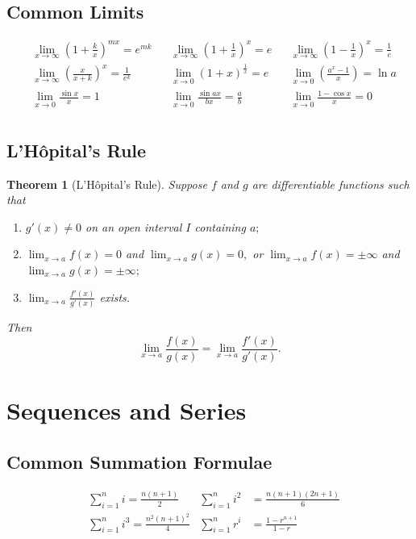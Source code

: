 \documentclass[12pt]{article}
\newtheorem{thrm}{Theorem}
\begin{document}
\subsection{Common Limits}
\begin{align*}
&\lim_{x \to \infty}{\left(1 + \frac{k}{x}\right)}^{mx} = e^{mk} & &\lim_{x \to \infty}{\left(1 + \frac{1}{x}\right)}^{x} = e & &\lim_{x \to \infty}{\left(1 - \frac{1}{x}\right)}^{x} = \frac{1}{e}\\
&\lim_{x \to \infty}{\left(\frac{x}{x+k}\right)}^{x} = \frac{1}{e^k} & &\lim_{x \to 0}{\left(1 + x\right)}^{\frac{1}{x}} = e & &\lim_{x \to 0}{\left(\frac{a^x - 1}{x}\right)} = \ln a \\ 
&\lim_{x \to 0}{\frac{\sin x}{x}} = 1 & &\lim_{x \to 0}{\frac{\sin{ax}}{bx}} = \frac{a}{b} & &\lim_{x \to 0}{\frac{1 - \cos x}{x}} = 0 \\
\end{align*}

\subsection{L'H\^{o}pital's Rule}
\begin{thrm}[L'H\^{o}pital's Rule]
	Suppose $f$ and $g$ are differentiable functions such that
\begin{enumerate}
	\item $g'(x) \neq 0$ on an open interval  $I$ containing $a;$
	\item $\lim_{x\to a} f(x) = 0$ and $\lim_{x\to a} g(x) = 0,$ or $\lim_{x\to a} f(x) = \pm \infty$ and $\lim_{x\to a} g(x) = \pm \infty;$
	\item $\lim_{x\to a} \frac{f'(x)}{g'(x)}$ exists.
\end{enumerate}
	Then
	$$\lim_{x\to a} \frac{f(x)}{g(x)} = \lim_{x\to a} \frac{f'(x)}{g'(x)}.$$
\end{thrm}


\section{Sequences and Series}
\subsection{Common Summation Formulae}
\begin{align*}
&\sum_{i = 1}^{n} i = \frac{n(n+1)}{2} & \sum_{i = 1}^{n} i^2 &= \frac{n(n+1)(2n+1)}{6} \\
&\sum_{i = 1}^{n}i^3 = \frac{n^2(n+1)^2}{4} & \sum_{i = 1}^{n}r^i &= \frac{1-r^{n+1}}{1-r}
\end{align*}
\end{document}

